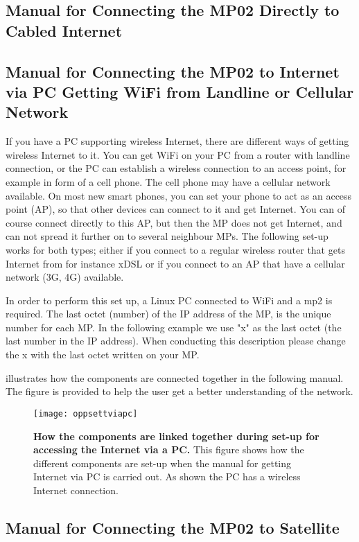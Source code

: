 \subsection{Manual for Connecting the MP02 Directly to Cabled Internet}
\label{subsec:cabledInternet}

\clearpage
\subsection{Manual for Connecting the MP02 to Internet via PC Getting WiFi from Landline or Cellular Network}
\label{subsec:internetviaPC}

If you have a PC supporting wireless Internet, there are different ways of getting wireless Internet to it. You can get WiFi on your PC from a router with landline connection, or the PC can establish a wireless connection to an access point, for example in form of a cell phone. The cell phone may have a cellular network available. On most new smart phones, you can set your phone to act as an access point (AP), so that other devices can connect to it and get Internet. You can of course connect directly to this AP, but then the MP does not get Internet, and can not spread it further on to several neighbour MPs. The following set-up works for both types; either if you connect to a regular wireless router that gets Internet from for instance xDSL or if you connect to an AP that have a cellular network (3G, 4G) available. 

In order to perform this set up, a Linux PC connected to WiFi and a \gls{mp2} is required. The last octet (number) of the IP address of the MP, is the unique number for each MP. In the following example we use "x" as the last octet (the last number in the IP address). When conducting this description please change the x with the last octet written on your MP.

 illustrates how the components are connected together in the following manual. The figure is provided to help the user get a better understanding of the network. 

\begin{figure}[h!]
  \centering
      \texttt{[image: oppsettviapc]}
  \caption [How the components are linked together during set-up for accessing the Internet via a PC]{\textbf{How the components are linked together during set-up for accessing the Internet via a PC.} This figure shows how the different components are set-up when the manual for getting Internet via PC is carried out. As shown the PC has a wireless Internet connection.}
  \label{fig:oppsettviapc}
\end{figure}


\clearpage

 
\clearpage
\subsection{Manual for Connecting the MP02 to Satellite}

\clearpage
